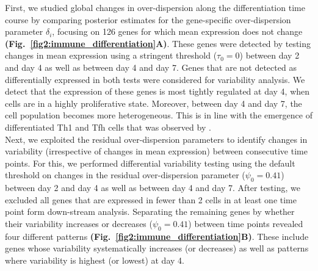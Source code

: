 First, we studied global changes in over-dispersion along the differentiation time course by comparing posterior estimates for the gene-specific over-dispersion parameter $\delta_i$, focusing on 126 genes for which mean expression does not change \textbf{(Fig.~\ref{fig2:immune_differentiation}A)}. These genes were detected by testing changes in mean expression using a stringent threshold ($\tau_0=0$) between day 2 and day 4 as well as between day 4 and day 7. Genes that are not detected as differentially expressed in both tests were considered for variability analysis. We detect that the expression of these genes is most tightly regulated at day 4, when cells are in a highly proliferative state. Moreover, between day 4 and day 7, the cell population becomes more heterogeneous. This is in line with the emergence of differentiated Th1 and Tfh cells that was observed by \cite{Lonnberg2017}. \\

Next, we exploited the residual over-dispersion parameters to identify changes in variability (irrespective of changes in mean expression) between consecutive time points. For this, we performed differential variability testing using the default threshold on changes in the residual over-dispersion parameter ($\psi_0 = 0.41$) between day 2 and day 4 as well as between day 4 and day 7. After testing, we excluded all genes that are expressed in fewer than 2 cells in at least one time point form down-stream analysis. Separating the remaining genes by whether their variability increases or decreases ($\psi_0 = 0.41$) between time points revealed four different patterns \textbf{(Fig.~\ref{fig2:immune_differentiation}B)}. These include genes whose variability systematically increases (or decreases) as well as patterns where variability is highest (or lowest) at day 4. 

\newpage

